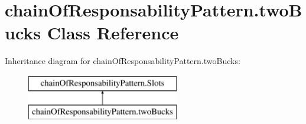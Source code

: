 \hypertarget{classchain_of_responsability_pattern_1_1two_bucks}{}\section{chain\+Of\+Responsability\+Pattern.\+two\+Bucks Class Reference}
\label{classchain_of_responsability_pattern_1_1two_bucks}
Inheritance diagram for chain\+Of\+Responsability\+Pattern.\+two\+Bucks\+:\begin{figure}[H]
\begin{center}
\leavevmode
\includegraphics[height=2.000000cm]{classchain_of_responsability_pattern_1_1two_bucks}
\end{center}
\end{figure}
